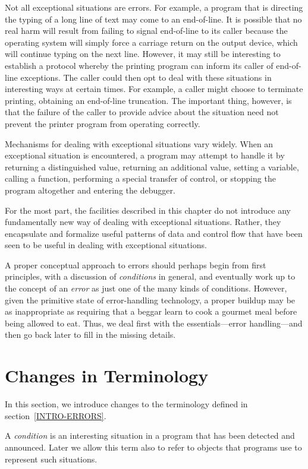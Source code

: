 Not all exceptional situations are errors.  For example, a program that is
directing the typing of a long line of text may come to an end-of-line.
It is possible that no real harm will result from failing to signal end-of-line
to its caller because the operating system will simply force a carriage
return on the output device, which will continue typing on the next line. However, it
may still be interesting to establish a protocol whereby the printing program can
inform its caller of end-of-line exceptions. The caller could
then opt to deal with these situations in interesting ways at certain times.
For example, a caller might choose to terminate printing, obtaining an end-of-line
truncation. The important thing, however, is that the failure of the
caller to provide advice about the situation need not prevent
the printer program from operating correctly.

Mechanisms for dealing with exceptional situations vary widely. When an
exceptional situation is encountered, a program may attempt to handle
it by returning a distinguished value, returning an additional value,
setting a variable, calling a function, performing a special transfer of
control, or stopping the program altogether and entering the debugger.

For the most part, the facilities described in this chapter do not introduce
any fundamentally new way of dealing with exceptional situations. Rather, they
encapsulate and formalize useful patterns of data and control flow that have
been seen to be useful in dealing with exceptional situations.

A proper conceptual approach to errors should perhaps begin from first
principles, with a discussion of \emph{conditions} in general, and eventually work
up to the concept of an \emph{error} as just one of the many kinds of
conditions. However, given the primitive state of error-handling
technology, a proper buildup may be as inappropriate as requiring that a
beggar learn to cook a gourmet meal before being allowed to eat.  Thus,
we deal first with the essentials---error handling---and then
go back later to fill in the missing details.

\section{Changes in Terminology}

In this section, we introduce changes to the terminology
defined in section~\ref{INTRO-ERRORS}.

A \emph{condition} is an interesting situation in a program that has been
detected and announced. Later we allow this term also to refer to
objects that programs use to represent such situations.

